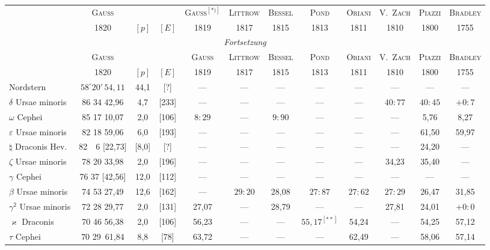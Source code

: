 \documentclass[12pt,a4paper]{article}
\theoremstyle{plain}
\theoremstyle{definition}
\theoremstyle{remark}
\begin{document}
\medskip
\begin{center}
{\small
\begin{longtable}{l|c|c|c|c|c|c|c|c|c|c|c}
\toprule
& \textsc{Gauss} & & & \textsc{Gauss}$^{[*)]}$ & \textsc{Littrow} & \textsc{Bessel} & \textsc{Pond} & \textsc{Oriani} & \textsc{V.\ Zach} & \textsc{Piazzi} & \textsc{Bradley} \\
& 1820 & $[p]$ & $[E]$ & 1819 & 1817 & 1815 & 1813 & 1811 & 1810 & 1800 & 1755 \\
\midrule
\endfirsthead
\multicolumn{12}{c}{\textit{Fortsetzung}}\\
\toprule
& \textsc{Gauss} & & & \textsc{Gauss} & \textsc{Littrow} & \textsc{Bessel} & \textsc{Pond} & \textsc{Oriani} & \textsc{V.\ Zach} & \textsc{Piazzi} & \textsc{Bradley} \\
& 1820 & $[p]$ & $[E]$ & 1819 & 1817 & 1815 & 1813 & 1811 & 1810 & 1800 & 1755 \\
\midrule
\endhead
\bottomrule
\endfoot
Nordstern & $58^\circ 20'\,54,11$ & 44,1 & [?] & --- & --- & --- & --- & --- & --- & --- & --- \\
$\delta$ Ursae minoris & 86 34 42,96 & 4,7 & [233] & --- & --- & --- & --- & --- & $40\!\!:\!\!77$ & $40\!\!:\!\!45$ & $+0\!\!:\!\!7$ \\
$\omega$ Cephei & 85 17 10,07 & 2,0 & [106] & $8\!\!:\!\!29$ & --- & $9\!\!:\!\!90$ & --- & --- & --- & 5,76 & 8,27 \\
$\varepsilon$ Ursae minoris & 82 18 59,06 & 6,0 & [193] & --- & --- & --- & --- & --- & --- & 61,50 & 59,97 \\
$\natural$ Draconis Hev. & 82\ \ 6 [22,73] & [8,0] & [?] & --- & --- & --- & --- & --- & --- & 24,20 & --- \\
$\zeta$ Ursae minoris & 78 20 33,98 & 2,0 & [196] & --- & --- & --- & --- & --- & 34,23 & 35,40 & --- \\
$\gamma$ Cephei & 76 37 [42,56] & 12,0 & [112] & --- & --- & --- & --- & --- & --- & --- & --- \\
$\beta$ Ursae minoris & 74 53 27,49 & 12,6 & [162] & --- & $29\!\!:\!\!20$ & 28,08 & $27\!\!:\!\!87$ & $27\!\!:\!\!62$ & $27\!\!:\!\!29$ & 26,47 & 31,85 \\
$\gamma^2$ Ursae minoris & 72 28 29,77 & 2,0 & [131] & 27,07 & --- & 28,79 & --- & --- & 27,81 & 24,01 & $+0\!\!:\!\!0$ \\
$\varkappa$ Draconis & 70 46 56,38 & 2,0 & [106] & 56,23 & --- & --- & $55,17^{[**]}$ & 54,24 & --- & 54,25 & 57,12 \\
$\tau$ Cephei & 70 29\quad\, 61,84 & 8,8 & [78] & 63,72 & --- & --- & --- & 62,49 & --- & 58,06 & 57,14 \\

\end{longtable}}
\end{center}
\end{document}
